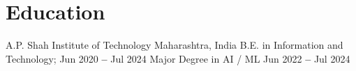 \section{Education}
  \vspace{3pt}
  \resumeSubHeadingListStart

    \resumeEducationHeading
      {A.P. Shah Institute of Technology
      }{Maharashtra, India}
      {B.E. in Information and Technology;
      }
      {Jun 2020 \textbf{--} Jul 2024}
      {Major Degree in AI / ML
      }{Jun 2022 \textbf{--} Jul 2024}


  \resumeSubHeadingListEnd
